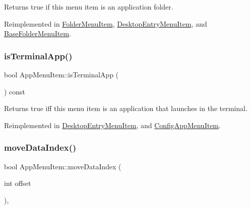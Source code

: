 \begin{DoxyReturn}{Returns}
true if this menu item is an application folder. 
\end{DoxyReturn}


Reimplemented in \mbox{\hyperlink{classFolderMenuItem_a04f57be51d2e79ca6d5e8ed5cdff7815}{Folder\+Menu\+Item}}, \mbox{\hyperlink{classDesktopEntryMenuItem_aad1d7a68badcde44cd25344e3b8382ab}{Desktop\+Entry\+Menu\+Item}}, and \mbox{\hyperlink{classBaseFolderMenuItem_abde18847e5e1c7c06c23d8e947bfdcc6}{Base\+Folder\+Menu\+Item}}.

\mbox{\label{classAppMenuItem_ac8e0c435f1e5dcf67dff223d819f6a2d}} 
\subsubsection{\texorpdfstring{is\+Terminal\+App()}{isTerminalApp()}}
{\footnotesize\ttfamily bool App\+Menu\+Item\+::is\+Terminal\+App (\begin{DoxyParamCaption}{ }\end{DoxyParamCaption}) const\hspace{0.3cm}{\ttfamily [virtual]}}

\begin{DoxyReturn}{Returns}
true iff this menu item is an application that launches in the terminal. 
\end{DoxyReturn}


Reimplemented in \mbox{\hyperlink{classDesktopEntryMenuItem_a6018762c850c13febc94792c81dd7e33}{Desktop\+Entry\+Menu\+Item}}, and \mbox{\hyperlink{classConfigAppMenuItem_ae986dacefb0b3fb79917452b4857d6ec}{Config\+App\+Menu\+Item}}.

\mbox{\label{classAppMenuItem_a66b922c9168e1df29f61ca6e98726d16}} 
\subsubsection{\texorpdfstring{move\+Data\+Index()}{moveDataIndex()}}
{\footnotesize\ttfamily bool App\+Menu\+Item\+::move\+Data\+Index (\begin{DoxyParamCaption}\item[{int}]{offset }\end{DoxyParamCaption})\hspace{0.3cm}{\ttfamily [protected]}, {\ttfamily [virtual]}}

